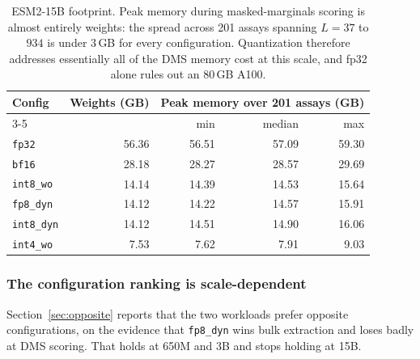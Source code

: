 \documentclass[11pt]{article}
\newcommand{\cfg}[1]{\texttt{#1}}
\begin{document}
\begin{table}[htb]
\centering
\caption{ESM2-15B footprint. Peak memory during masked-marginals scoring is
almost entirely weights: the spread across 201 assays spanning $L = 37$ to $934$
is under $3$\,GB for every configuration. Quantization therefore addresses
essentially all of the DMS memory cost at this scale, and fp32 alone rules out
an 80\,GB A100.}
\label{tab:res15b}
\small
\begin{tabular}{lrrrr}
\toprule
Config & Weights (GB) & \multicolumn{3}{c}{Peak memory over 201 assays (GB)} \\
\cmidrule(lr){3-5}
       &              & min & median & max \\
\midrule
\cfg{fp32}      & 56.36 & 56.51 & 57.09 & 59.30 \\
\cfg{bf16}      & 28.18 & 28.27 & 28.57 & 29.69 \\
\cfg{int8\_wo}  & 14.14 & 14.39 & 14.53 & 15.64 \\
\cfg{fp8\_dyn}  & 14.12 & 14.22 & 14.57 & 15.91 \\
\cfg{int8\_dyn} & 14.12 & 14.51 & 14.90 & 16.06 \\
\cfg{int4\_wo}  &  7.53 &  7.62 &  7.91 &  9.03 \\
\bottomrule
\end{tabular}
\end{table}

\subsubsection{The configuration ranking is scale-dependent}
\label{sec:scaledep}

Section~\ref{sec:opposite} reports that the two workloads prefer opposite
configurations, on the evidence that \cfg{fp8\_dyn} wins bulk extraction and
loses badly at DMS scoring. That holds at 650M and 3B and stops holding at 15B.
\end{document}
